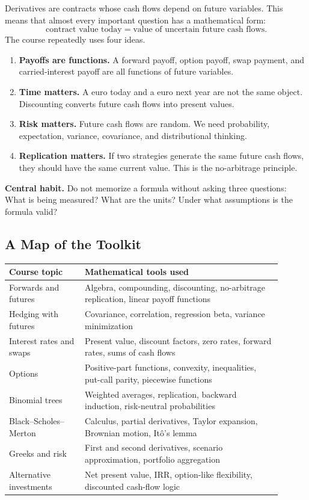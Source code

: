 Derivatives are contracts whose cash flows depend on future variables. This
means that almost every important question has a mathematical form:
\[
    \text{contract value today}
    =
    \text{value of uncertain future cash flows}.
\]
The course repeatedly uses four ideas.
\begin{enumerate}
    \item \textbf{Payoffs are functions.} A forward payoff, option payoff, swap
    payment, and carried-interest payoff are all functions of future variables.
    \item \textbf{Time matters.} A euro today and a euro next year are not the
    same object. Discounting converts future cash flows into present values.
    \item \textbf{Risk matters.} Future cash flows are random. We need
    probability, expectation, variance, covariance, and distributional thinking.
    \item \textbf{Replication matters.} If two strategies generate the same
    future cash flows, they should have the same current value. This is the
    no-arbitrage principle.
\end{enumerate}

\begin{boxF}
\textbf{Central habit.} Do not memorize a formula without asking three questions:
What is being measured? What are the units? Under what assumptions is the formula
valid?
\end{boxF}

\subsection{A Map of the Toolkit}

\begin{tabular}{@{}p{0.25\linewidth}p{0.65\linewidth}@{}}
\toprule
Course topic & Mathematical tools used \\
\midrule
Forwards and futures & Algebra, compounding, discounting, no-arbitrage
replication, linear payoff functions \\
Hedging with futures & Covariance, correlation, regression beta, variance
minimization \\
Interest rates and swaps & Present value, discount factors, zero rates, forward
rates, sums of cash flows \\
Options & Positive-part functions, convexity, inequalities, put-call parity,
piecewise functions \\
Binomial trees & Weighted averages, replication, backward induction, risk-neutral
probabilities \\
Black--Scholes--Merton & Calculus, partial derivatives, Taylor expansion,
Brownian motion, It\^o's lemma \\
Greeks and risk & First and second derivatives, scenario approximation,
portfolio aggregation \\
Alternative investments & Net present value, IRR, option-like flexibility,
discounted cash-flow logic \\
\bottomrule
\end{tabular}

